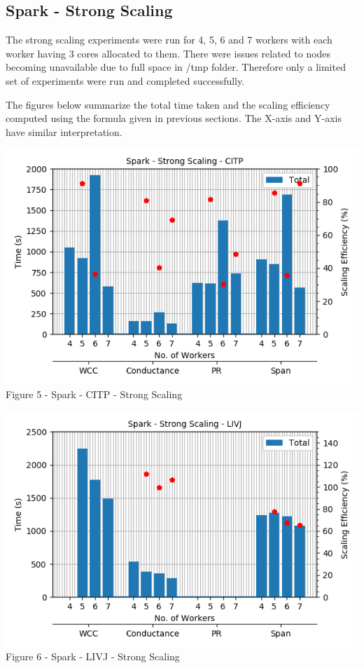\documentclass[11pt,a4paper,oneside]{article}
\begin{document}
    \subsection{Spark - Strong Scaling}
    
    The strong scaling experiments were run for 4, 5, 6 and 7 workers with each worker having 3 cores allocated to them. There were issues related to nodes becoming unavailable due to full space in /tmp folder. Therefore only a limited set of experiments were run and completed successfully.
    
    The figures below summarize the total time taken and the scaling efficiency computed using the formula given in previous sections. The X-axis and Y-axis have similar interpretation.
    
    \begin{center}
    	\includegraphics[scale=0.5]{5.png} \\
    	Figure 5 - Spark - CITP - Strong Scaling	
    \end{center}

    \begin{center}
    	\includegraphics[scale=0.5]{6.png} \\
    	Figure 6 - Spark - LIVJ - Strong Scaling	
    \end{center}
\end{document}
